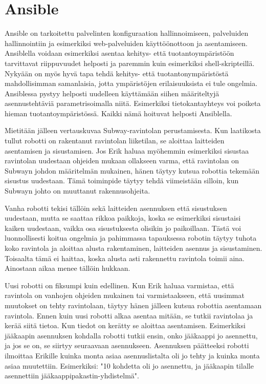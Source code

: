 \chapter{Ansible}

Ansible on tarkoitettu palvelinten konfiguraation hallinnoimiseen, palveluiden hallinnointiin ja esimerkiksi web-palveluiden käyttöönottoon ja asentamiseen. Ansiblella voidaan esimerkiksi asentaa kehitys- että tuotantoympäristöön tarvittavat riippuvuudet helposti ja paremmin kuin esimerkiksi shell-skripteillä. Nykyään on myös hyvä tapa tehdä kehitys- että tuotantonympäristöstä mahdollisimman samanlaisia, jotta ympäristöjen erilaisuuksista ei tule ongelmia. Ansiblessa pystyy helposti uudelleen käyttämään siihen määriteltyjä asennustehtäviä parametrisoimalla niitä. Esimerkiksi tietokantayhteys voi poiketa hieman tuotantoympäristössä. Kaikki nämä hoituvat helposti Ansiblella.

Mietitään jälleen vertauskuvaa Subway-ravintolan perustamisesta. Kun laatikosta tullut robotti on rakentanut ravintolan liiketilan, se aloittaa laitteiden asentamisen ja sisustamisen. Jos Erik haluaa myöhemmin esimerkiksi sisustaa ravintolan uudestaan ohjeiden mukaan ollakseen varma, että ravintolan on Subwayn johdon määritelmän mukainen, hänen täytyy kutsua robottia tekemään sisustus uudestaan. Tämä toiminpide täytyy tehdä viimeistään silloin, kun Subwayn johto on muuttanut rakennusohjeita.

Vanha robotti tekisi tällöin sekä laitteiden asennuksen että sisustuksen uudestaan, mutta se saattaa rikkoa paikkoja, koska se esimerkiksi sisustaisi kaiken uudestaan, vaikka osa sisustuksesta olisikin jo paikoillaan. Tästä voi luonnollisesti koitua ongelmia ja pahimmassa tapauksessa robotin täytyy tuhota koko ravintola ja aloittaa alusta rakentaminen, laitteiden asennus ja sisustaminen. Toisaalta tämä ei haittaa, koska alusta asti rakennettu ravintola toimii aina. Ainostaan aikaa menee tällöin hukkaan.

Uusi robotti on fiksumpi kuin edellinen. Kun Erik haluaa varmistaa, että ravintola on vanhojen ohjeiden mukainen tai varmistaakseen, että uusimmat muutokset on tehty ravintolaan, täytyy hänen jälleen kutsua robottia asentamaan ravintola. Ennen kuin uusi robotti alkaa asentaa mitään, se tutkii ravintolaa ja kerää siitä tietoa. Kun tiedot on kerätty se aloittaa asentamisen. Esimerkiksi jääkaapin asennuksen kohdalla robotti tutkii ensin, onko jääkaappi jo asennettu, ja jos se on, se siirtyy seuraavaan asennukseen. Asennuksen päätteeksi robotti ilmoittaa Erikille kuinka monta asiaa asennuslistalta oli jo tehty ja kuinka monta asiaa muutettiin. Esimerkiksi: "10 kohdetta oli jo asennettu, ja jääkaapin tilalle asennettiin jääkaappipakastin-yhdistelmä".

